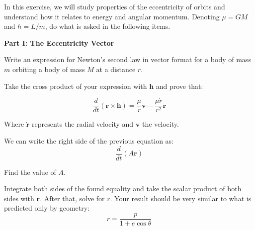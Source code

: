 \documentclass[11pt]{article}
\begin{document}






\begin{pproblem}
In this exercise, we will study properties of the eccentricity of orbits and understand how it relates to energy and angular momentum. Denoting $\mu = GM$ and $h=L/m$, do what is asked in the following items.

\begin{center}
    \textbf{Part I: The Eccentricity Vector}
\end{center}
\begin{alternativas}
    \item Write an expression for Newton's second law in vector format for a body of mass $m$ orbiting a body of mass $M$ at a distance $r$.
    
    \item Take the cross product of your expression with $\mathbf{h}$ and prove that:
    
    \[\frac{d}{dt}(\dot{\mathbf{r}}\times \mathbf{h}) = \frac{\mu}{r}\mathbf{v} - \frac{\mu \dot{r}}{r^2}\mathbf{r}\]

    Where $\dot{\mathbf{r}}$ represents the radial velocity and $\mathbf{v}$ the velocity.

    \item We can write the right side of the previous equation as:
    \[\frac{d}{dt}\left(A\mathbf{r}\right)\]

    Find the value of $A$.

    \item Integrate both sides of the found equality and take the scalar product of both sides with $\mathbf{r}$. After that, solve for $r$. Your result should be very similar to what is predicted only by geometry:
    \[r = \frac{p}{1+e\cos\theta}\]


\end{alternativas}
\end{pproblem}
\end{document}
